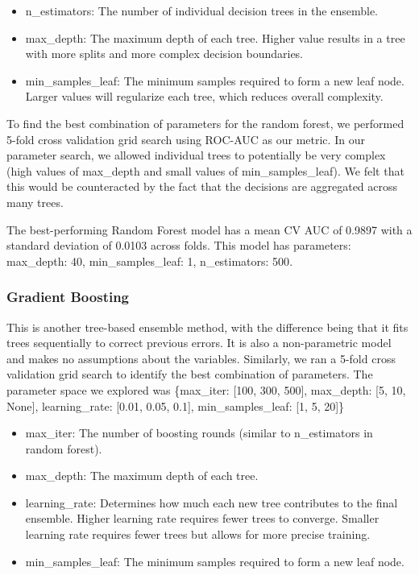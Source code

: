\documentclass[10pt,letterpaper]{article}
\begin{document}
\begin{itemize}
    \item n\_estimators: The number of individual decision trees in the ensemble.
    \item max\_depth: The maximum depth of each tree. Higher value results in a tree with more splits and more complex decision boundaries.
    \item min\_samples\_leaf: The minimum samples required to form a new leaf node. Larger values will regularize each tree, which reduces overall complexity.
\end{itemize}

To find the best combination of parameters for the random forest, we performed 5-fold cross validation grid search using ROC-AUC as our metric. In our parameter search, we allowed individual trees to potentially be very complex (high values of max\_depth and small values of min\_samples\_leaf). We felt that this would be counteracted by the fact that the decisions are aggregated across many trees.

The best-performing Random Forest model has a mean CV AUC of 0.9897 with a standard deviation of 0.0103 across folds. This model has parameters: {max\_depth: 40, min\_samples\_leaf: 1, n\_estimators: 500}.


\subsubsection*{Gradient Boosting}

This is another tree-based ensemble method, with the difference being that it fits trees sequentially to correct previous errors. It is also a non-parametric model and makes no assumptions about the variables. Similarly, we ran a 5-fold cross validation grid search to identify the best combination of parameters. The parameter space we explored was \{max\_iter: [100, 300, 500], max\_depth: [5, 10, None], learning\_rate: [0.01, 0.05, 0.1], min\_samples\_leaf: [1, 5, 20]\}

\begin{itemize}
    \item max\_iter: The number of boosting rounds (similar to n\_estimators in random forest).
    \item max\_depth: The maximum depth of each tree.
    \item learning\_rate: Determines how much each new tree contributes to the final ensemble. Higher learning rate requires fewer trees to converge. Smaller learning rate requires fewer trees but allows for more precise training.
    \item min\_samples\_leaf: The minimum samples required to form a new leaf node.
\end{itemize}
\end{document}
